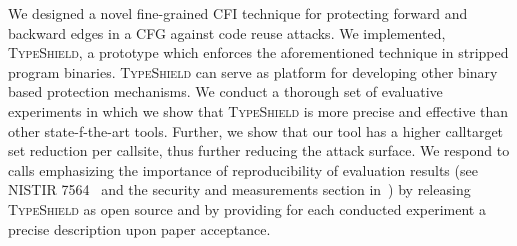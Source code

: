 We designed a novel fine-grained CFI technique for protecting forward and backward edges in a CFG
 against code reuse attacks. We implemented, \textsc{TypeShield}, a prototype which enforces the aforementioned technique
 in stripped program binaries. \textsc{TypeShield} can serve as platform for developing other binary based protection mechanisms.
We conduct a thorough set of evaluative experiments in which we show that \textsc{TypeShield} is more precise and effective than 
 other state-f-the-art tools. Further, we show that our tool has a higher calltarget set reduction per callsite, thus further reducing the attack surface.
We respond to calls emphasizing the importance of reproducibility of evaluation results (see NISTIR 7564~\cite{reprod:nist} and the security and measurements 
section in~\cite{herley:security}) by releasing \textsc{TypeShield} as open source and by providing for each conducted experiment a precise description 
upon paper acceptance.



% 


